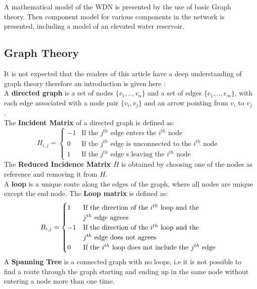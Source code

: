 A mathematical model of the WDN is presented by the use of basic Graph theory. Then component model for various components in the network is presented, including a model of an elevated water reservoir. 

\subsection{Graph Theory}
It is not expected that the readers of this article have a deep understanding of graph theory therefore an introduction is given here \cite[Chap. 9]{Deo}:\\  
 
A \textbf{directed graph} is a set of nodes $ \{v_1,..,v_n\} $ and a set of edges $ \{e_1,..,e_m\} $, with each edge associated with a node pair $ \{v_i,v_j\} $ and an arrow pointing from $ v_i $ to $ v_j $. \\

The \textbf{Incident Matrix} of a directed graph is defined as:
\begin{equation*}
	H_{i,j} = \begin{cases}
		-1 & \text{If the $j^{th}$ edge enters the $i^{th}$ node} \\
		0 & \text{If the $j^{th}$ edge is unconnected to the $i^{th}$ node} \\
		1 & \text{If the $j^{th}$ edge s leaving the $i^{th}$ node}
	\end{cases}
\end{equation*} %
The \textbf{Reduced Incidence Matrix $\bar{H}$} is obtained by choosing one of the nodes as reference and removing it from $ H $.\\

A \textbf{loop} is a unique route along the edges of the graph, where all nodes are unique except the end node. The \textbf{Loop matrix} is defined as:
\begin{equation*}
	B_{i,j} = \begin{cases}
		1 & \text{If the direction of the $ i^{th} $ loop and the} \\& \text{$j^{th}$ edge agrees}\\
		-1 & \text{If the direction of the $ i^{th} $ loop and the} \\& \text{$j^{th}$ edge does not agrees}\\
		0 & \text{If the $ i^{th} $ loop does not include the $ j^{th} $ edge}\\
\end{cases}
\end{equation*}
A \textbf{Spanning Tree} is a connected graph with no loops, i.e it is not possible to find a route through the graph starting and ending up in the same node without entering a node more than one time. \\

